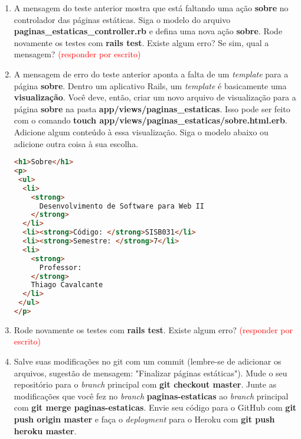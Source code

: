 \documentclass[a4paper,12pt]{article}
\begin{document}
\begin{enumerate}
  \item A mensagem do teste anterior mostra que está faltando uma ação \textbf{sobre} no controlador das páginas estáticas. Siga o modelo do arquivo \textbf{paginas\_estaticas\_controller.rb} e defina uma nova ação \textbf{sobre}. Rode novamente os testes com \textbf{rails test}. Existe algum erro? Se sim, qual a mensagem? \textcolor{red}{(responder por escrito)}
  \item A mensagem de erro do teste anterior aponta a falta de um \textit{template} para a página \textbf{sobre}. Dentro um aplicativo Rails, um \textit{template} é basicamente uma \textbf{visualização}. Você deve, então, criar um novo arquivo de visualização para a página \textbf{sobre} na pasta \textbf{app/views/paginas\_estaticas}. Isso pode ser feito com o comando \textbf{touch app/views/paginas\_estaticas/sobre.html.erb}. Adicione algum conteúdo à essa visualização. Siga o modelo abaixo ou adicione outra coisa à sua escolha.

  \begin{lstlisting}[language=html, title=app/views/paginas\_estaticas/sobre.html.erb]
<h1>Sobre</h1>
<p>
 <ul>
  <li>
    <strong>
      Desenvolvimento de Software para Web II
    </strong>
  </li>
  <li><strong>Código: </strong>SISB031</li>
  <li><strong>Semestre: </strong>7</li>
  <li>
    <strong>
      Professor:
    </strong>
    Thiago Cavalcante
  </li>
 </ul>
</p>
  \end{lstlisting}

  \item Rode novamente os testes com \textbf{rails test}. Existe algum erro? \textcolor{red}{(responder por escrito)}
  \item Salve suas modificações no git com um commit (lembre-se de adicionar os arquivos, sugestão de mensagem: "Finalizar páginas estáticas"). Mude o seu repositório para o \textit{branch} principal com \textbf{git checkout master}. Junte as modificações que você fez no \textit{branch} \textbf{paginas-estaticas} ao \textit{branch} principal com \textbf{git merge paginas-estaticas}. Envie seu código para o GitHub com \textbf{git push origin master} e faça o \textit{deployment} para o Heroku com \textbf{git push heroku master}.
\end{enumerate}
\end{document}
